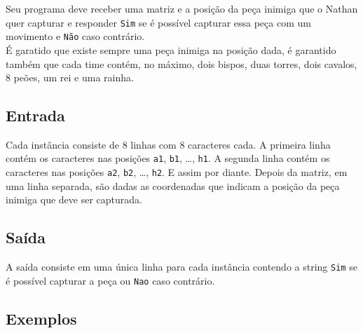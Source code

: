 Seu programa deve receber uma matriz e a posição da peça inimiga que o Nathan quer capturar e responder \texttt{Sim} se é possível capturar essa peça com um movimento e \texttt{Não} caso contrário. \\
É garatido que existe sempre uma peça inimiga na posição dada, é garantido também que cada time contém, no máximo, dois bispos, duas torres, dois cavalos, 8 peões, um rei e uma rainha. \\


\subsection*{Entrada}
\textoDiversasInstanciasEOF

Cada instância consiste de 8 linhas com 8 caracteres cada. A primeira linha contém os caracteres nas posições \texttt{a1}, \texttt{b1}, \dots, \texttt{h1}. A segunda linha contém os caracteres nas posições \texttt{a2}, \texttt{b2}, \dots, \texttt{h2}. E assim por diante. Depois da matriz, em uma linha separada, são dadas as coordenadas que indicam a posição da peça inimiga que deve ser capturada. \\


\subsection*{Saída}

A saída consiste em uma única linha para cada instância contendo a string \texttt{Sim} se é possível capturar a peça ou \texttt{Nao} caso contrário.


\subsection*{Exemplos}


